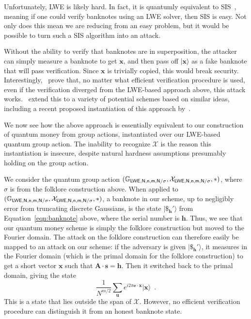 \documentclass{article}\usepackage[a4paper,margin=20mm]{geometry}
\numberwithin{theorem}{section}
\numberwithin{equation}{section}
\newcommand{\G}{\mathbb{G}}
\newcommand{\ev}{{\mathbf{e}}}
\newcommand{\hv}{{\mathbf{h}}}
\newcommand{\sv}{{\mathbf{s}}}
\newcommand{\uv}{{\mathbf{u}}}
\newcommand{\xv}{{\mathbf{x}}}
\newcommand{\Am}{{\mathbf{A}}}
\newcommand{\Xs}{{\mathcal{X}}}
\begin{document}
Unfortunately, LWE is likely hard. In fact, it is quantumly equivalent to SIS~\cite{DBLP:journals/jacm/Regev09}, meaning if one could verify banknotes using an LWE solver, then SIS is easy. Not only does this mean we are reducing from an easy problem, but it would be possible to turn such a SIS algorithm into an attack.

Without the ability to verify that banknotes are in superposition, the attacker can simply measure a banknote to get $\xv$, and then pass off $|\xv\rangle$ as a fake banknote that will pass verification. Since $\xv$ is trivially copied, this would break security. Interestingly,~\cite{C:LiuZha19} prove that, no matter what efficient verification procedure is used, even if the verification diverged from the LWE-based approach above, this attack works.~\cite{EC:LiuMonZha23} extend this to a variety of potential schemes based on similar ideas, including a recent proposed instantiation of this approach by~\cite{KLS22}.

\medskip

We now see how the above approach is essentially equivalent to our construction of quantum money from group actions, instantiated over our LWE-based quantum group action. The inability to recognize $\Xs$ is the reason this instantiation is insecure, despite natural hardness assumptions presumably holding on the group action.

We consider the quantum group action $(\G_{\sf LWE,N,n,m,N/\sigma},\Xs_{\sf LWE,N,n,m,N/\sigma},*)$, where $\sigma$ is from the folklore construction above. When applied to $(\G_{\sf LWE,N,n,m,N/\sigma},\Xs_{\sf LWE,N,n,m,N/\sigma},*)$, a banknote in our scheme, up to negligibly error from truncating discrete Gaussians, is the state $|\$_\hv'\rangle$ from Equation~\ref{eqn:banknote} above, where the serial number is $\hv$. Thus, we see that our quantum money scheme is simply the folklore construction but moved to the Fourier domain. The attack on the folklore construction can therefore easily be mapped to an attack on our scheme: if the adversary is given $|\$_\hv'\rangle$, it measures in the Fourier domain (which is the primal domain for the folklore construction) to get a short vector $\xv$ such that $\Am\cdot\sv=\hv$. Then it switched back to the primal domain, giving the state
\[\frac{1}{N^{m/2}}\sum_\uv e^{i2\pi\ev\cdot\xv}|\xv\rangle\enspace .\]
This is a state that lies outside the span of $\Xs$. However, no efficient verification procedure can distinguish it from an honest banknote state.

\medskip
\end{document}
